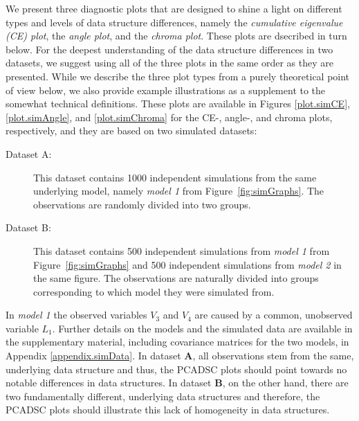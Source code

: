\documentclass[]{interact}
\theoremstyle{plain}%
\theoremstyle{definition}
\theoremstyle{remark}
\begin{document}
We present three diagnostic plots that are designed to shine a light on different types and levels of data structure differences, namely the \textit{cumulative eigenvalue (CE) plot}, the \textit{angle plot}, and the \textit{chroma plot}. These plots are dsecribed in turn below. For the deepest understanding of the data structure differences in two datasets, we suggest using all of the three plots in the same order as they are presented. While we describe the three plot types from a purely theoretical point of view below, we also provide example illustrations as a supplement to the somewhat technical definitions. These plots are available in Figures \ref{plot.simCE}, \ref{plot.simAngle}, and \ref{plot.simChroma} for the CE-, angle-, and chroma plots, respectively, and they are based on two simulated datasets:
\begin{description}
\item[Dataset A:] This dataset contains 1000 independent simulations from the same underlying model, namely \textit{model 1} from Figure~\ref{fig:simGraphs}. The observations are randomly divided into two groups.
\item[Dataset B:] This dataset contains 500 independent simulations from \textit{model 1} from Figure~\ref{fig:simGraphs} and 500 independent simulations from \textit{model 2} in the same figure. The observations are naturally divided into groups corresponding to which model they were simulated from.
\end{description}

In \textit{model 1} the observed variables $V_3$ and $V_4$ are caused by a common, unobserved variable $L_1$. Further details on the models and the simulated data are available in the supplementary material, including covariance matrices for the two models, in Appendix \ref{appendix.simData}. In dataset $\mathbf{A}$, all observations stem from the same, underlying data structure and thus, the PCADSC plots should point towards no notable differences in data structures. In dataset $\mathbf{B}$, on the other hand, there are two fundamentally different, underlying data structures and therefore, the PCADSC plots should illustrate this lack of homogeneity in data structures.


\end{document}
